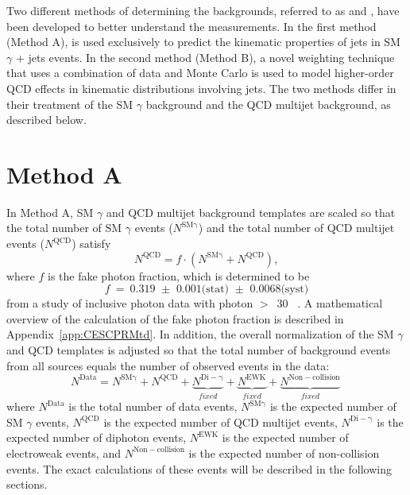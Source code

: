 Two different methods of determining the backgrounds, referred to as  and , have been developed to better understand the measurements. In the first method (Method A), \pythiaText is used exclusively to predict the kinematic properties of jets in SM $\gamma$ + jets events. In the second method (Method B), a novel weighting technique that uses a combination of data and \pythiaText Monte Carlo is used to model higher-order QCD effects in kinematic distributions involving jets. The two methods differ in their treatment of the SM $\gamma$ background and the QCD multijet background, as described below.


\section{Method A}\label{sec:MethodA}
In Method A, SM $\gamma$ and QCD multijet background templates are scaled so that the total number of SM $\gamma$ events ($N^\mathrm{SM\gamma}$) and the total number of QCD multijet events ($N^\mathrm{QCD}$) satisfy
\begin{equation}
N^\mathrm{QCD} = f \cdot (N^\mathrm{SM\gamma}+N^\mathrm{QCD}),\label{eqa:SMQCDscaling}
\end{equation}
where $f$ is the fake photon fraction, which is determined to be
\begin{equation}
f~=~\mbox{0.319 $\pm$ 0.001(stat) $\pm$ 0.0068(syst)}
\label{eqa:FakeFraction}
\end{equation}
from a study of inclusive photon data with photon \mbox{\et$>$ 30~\etUnits} \cite{pap:PhotonIDAndCESCPR}. A mathematical overview of the calculation of the fake photon fraction is described in Appendix~\ref{app:CESCPRMtd}. In addition, the overall normalization of the SM $\gamma$ and QCD templates is adjusted so that the total number of background events from all sources equals the number of observed events in the data:
\begin{equation}
 N^\mathrm{Data} = N^\mathrm{SM\gamma}+N^\mathrm{QCD}+\underbrace{N^\mathrm{Di-\gamma}}_{fixed}+\underbrace{N^\mathrm{EWK}}_{fixed}+\underbrace{N^\mathrm{Non-collision}}_{fixed}\, 
\label{eqa:MtdANorm}
\end{equation}
where $N^\mathrm{Data}$ is the total number of data events, $N^\mathrm{SM\gamma}$ is the expected number of SM $\gamma$ events, $N^\mathrm{QCD}$ is the expected number of QCD multijet events, $N^\mathrm{Di-\gamma}$ is the expected number of diphoton events, $N^\mathrm{EWK}$ is the expected number of electroweak events, and $N^\mathrm{Non-collision}$ is the expected number of non-collision events. The exact calculations of these events will be described in the following sections.

